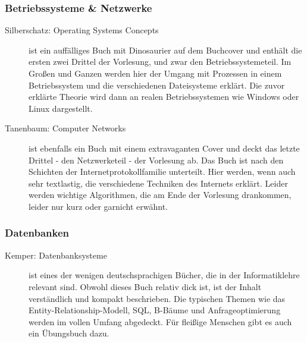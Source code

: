 \subsubsection{Betriebssysteme \& Netzwerke}
\begin{description}
\item[Silberschatz: Operating Systems Concepts]{
	ist ein auffälliges Buch mit Dinosaurier auf dem Buchcover und enthält die ersten zwei Drittel der Vorlesung, und zwar den Betriebssystemeteil. Im Großen und Ganzen werden hier der Umgang mit Prozessen in einem Betriebssystem und die verschiedenen Dateisysteme erklärt. Die zuvor erklärte Theorie wird dann an realen Betriebssystemen wie Windows oder Linux dargestellt.}
	
\item[Tanenbaum: Computer Networks]{
	ist ebenfalls ein Buch mit einem extravaganten Cover und deckt das letzte Drittel - den Netzwerketeil - der Vorlesung ab. Das Buch ist nach den Schichten der Internetprotokollfamilie unterteilt. Hier werden, wenn auch sehr textlastig, die verschiedene Techniken des Internets erklärt. Leider werden wichtige Algorithmen, die am Ende der Vorlesung drankommen, leider nur kurz oder garnicht erwähnt.}
\end{description}

\subsubsection{Datenbanken}
\begin{description}
\item[Kemper: Datenbanksysteme]{
	ist eines der wenigen deutschsprachigen Bücher, die in der Informatiklehre relevant sind. Obwohl dieses Buch relativ dick ist, ist der Inhalt verständlich und kompakt beschrieben. Die typischen Themen wie das Entity-Relationship-Modell, SQL, B-Bäume und Anfrageoptimierung werden im vollen Umfang abgedeckt. Für fleißige Menschen gibt es auch ein Übungsbuch dazu.}
\end{description}

